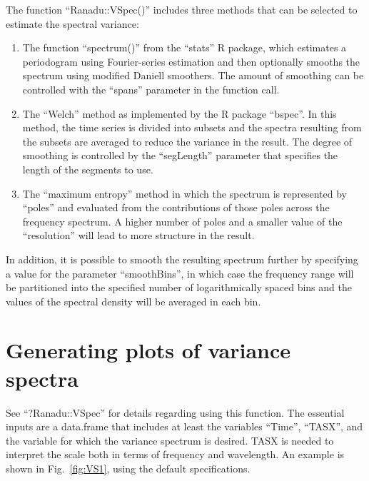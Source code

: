 \documentclass[12pt,english]{report}\usepackage[]{graphicx}\usepackage[]{color}
\begin{document}
The function ``Ranadu::VSpec()'' includes three methods that can
be selected to estimate the spectral variance:
\begin{enumerate}
\item The function ``spectrum()'' from the ``stats'' R package, which
estimates a periodogram using Fourier-series estimation and then optionally
smooths the spectrum using modified Daniell smoothers. The amount
of smoothing can be controlled with the ``spans'' parameter in the
function call.
\item The ``Welch'' method as implemented by the R package ``bspec''.
In this method, the time series is divided into subsets and the spectra
resulting from the subsets are averaged to reduce the variance in
the result. The degree of smoothing is controlled by the ``segLength''
parameter that specifies the length of the segments to use.
\item The ``maximum entropy'' method in which the spectrum is represented
by ``poles'' and evaluated from the contributions of those poles
across the frequency spectrum. A higher number of poles and a smaller
value of the ``resolution'' will lead to more structure in the result.
\end{enumerate}
In addition, it is possible to smooth the resulting spectrum further
by specifying a value for the parameter ``smoothBins'', in which
case the frequency range will be partitioned into the specified number
of logarithmically spaced bins and the values of the spectral density
will be averaged in each bin.

\pagebreak{}

\section{Generating plots of variance spectra}

See ``?Ranadu::VSpec'' for details regarding using this function.
The essential inputs are a data.frame that includes at least the variables
``Time'', ``TASX'', and the variable for which the variance spectrum
is desired. TASX is needed to interpret the scale both in terms of
frequency and wavelength. An example is shown in Fig.~\ref{fig:VS1},
using the default specifications.
\end{document}
